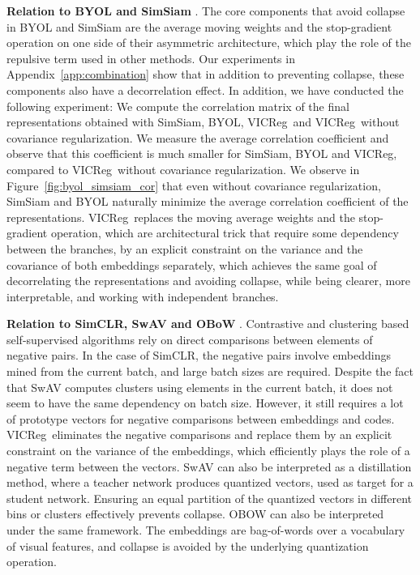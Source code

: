 \documentclass{article}
\newcommand{\algo}{VICReg}
\begin{document}
\vspace{2mm}
\textbf{Relation to BYOL and SimSiam} \cite{grill2020byol, chen2020simsiam}. The core components that avoid collapse in BYOL and SimSiam are the average moving weights and the stop-gradient operation on one side of their asymmetric architecture, which play the role of the repulsive term used in other methods. Our experiments in Appendix~\ref{app:combination} show that in addition to preventing collapse, these components also have a decorrelation effect. In addition, we have conducted the following experiment: We compute the correlation matrix of the final representations obtained with SimSiam, BYOL, \algo \ and \algo \ without covariance regularization. We measure the average correlation coefficient and observe that this coefficient is much smaller for SimSiam, BYOL and \algo, compared to \algo \ without covariance regularization. We observe in Figure~\ref{fig:byol_simsiam_cor} that even without covariance regularization, SimSiam and BYOL naturally minimize the average correlation coefficient of the representations. \algo \ replaces the moving average weights and the stop-gradient operation, which are architectural trick that require some dependency between the branches, by an explicit constraint on the variance and the covariance of both embeddings separately, which achieves the same goal of decorrelating the representations and avoiding collapse, while being clearer, more interpretable, and working with independent branches.

\vspace{2mm}
\textbf{Relation to SimCLR, SwAV and OBoW} \cite{caron2020swav, chen2020simclr, gidaris2021obow}. Contrastive and clustering based self-supervised algorithms rely on direct comparisons between elements of negative pairs. In the case of SimCLR, the negative pairs involve embeddings mined from the current batch, and large batch sizes are required. Despite the fact that SwAV computes clusters using elements in the current batch, it does not seem to have the same dependency on batch size. However, it still requires a lot of prototype vectors for negative comparisons between embeddings and codes. \algo \ eliminates the negative comparisons and replace them by an explicit constraint on the variance of the embeddings, which efficiently plays the role of a negative term between the vectors. SwAV can also be interpreted as a distillation method, where a teacher network produces quantized vectors, used as target for a student network. Ensuring an equal partition of the quantized vectors in different bins or clusters effectively prevents collapse. OBOW can also be interpreted under the same framework. The embeddings are bag-of-words over a vocabulary of visual features, and collapse is avoided by the underlying quantization operation.
\end{document}
